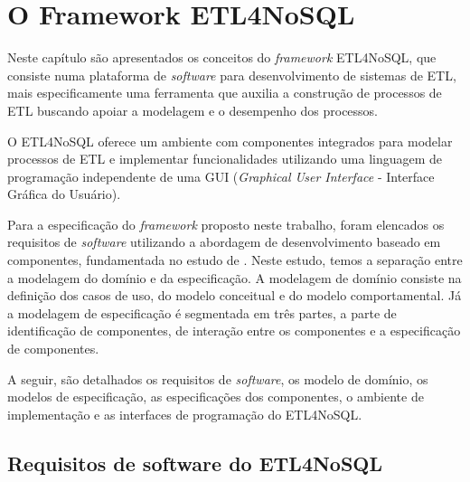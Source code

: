 \chapter{O Framework ETL4NoSQL}
Neste capítulo são apresentados os conceitos do \textit{framework} ETL4NoSQL, que consiste numa plataforma de \textit{software} para desenvolvimento de sistemas de ETL, mais especificamente uma ferramenta que auxilia a construção de processos de ETL buscando apoiar a modelagem e o desempenho dos processos. 

O ETL4NoSQL oferece um ambiente com componentes integrados para modelar processos de ETL e implementar funcionalidades utilizando uma linguagem de programação independente de uma GUI (\emph{Graphical User Interface} - Interface Gráfica do Usuário).


Para a especificação do \textit{framework} proposto neste trabalho, foram elencados os requisitos de \textit{software} utilizando a abordagem de desenvolvimento baseado em componentes, fundamentada no estudo de \cite{cheesman:2001}. Neste estudo, temos a separação entre a modelagem do domínio e da especificação. A modelagem de domínio consiste na definição dos casos de uso, do modelo conceitual e do modelo comportamental. Já a modelagem de especificação é segmentada em três partes, a parte de identificação de componentes, de interação entre os componentes e a especificação de componentes.  


A seguir, são detalhados os requisitos de \textit{software}, os modelo de domínio, os modelos de especificação, as especificações dos componentes, o ambiente de implementação e as interfaces de programação do ETL4NoSQL.


\clearpage
\section{Requisitos de software do ETL4NoSQL}


